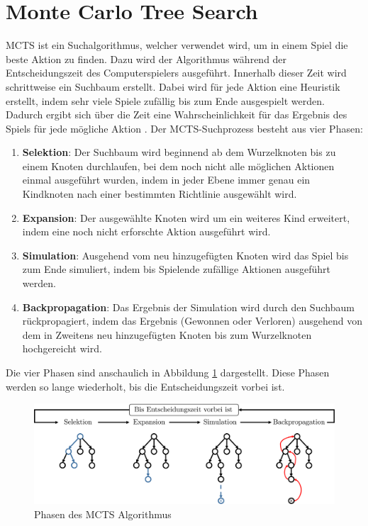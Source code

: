 \vspace*{-5cm}
\pagebreak

\section{Monte Carlo Tree Search}
\label{chapter:monte-carlo-tree-search}

\acf{MCTS} ist ein Suchalgorithmus, welcher verwendet wird, um in einem Spiel die beste Aktion zu finden. Dazu wird der Algorithmus während der Entscheidungszeit des Computerspielers ausgeführt. Innerhalb dieser Zeit wird schrittweise ein Suchbaum erstellt. Dabei wird für jede Aktion eine Heuristik erstellt, indem sehr viele Spiele zufällig bis zum Ende ausgespielt werden. Dadurch ergibt sich über die Zeit eine Wahrscheinlichkeit für das Ergebnis des Spiels für jede mögliche Aktion \cite[S. 61]{2008.ParallelMCTS}. Der \ac{MCTS}-Suchprozess besteht aus vier Phasen:

\begin{enumerate}
    \item \textbf{Selektion}: Der Suchbaum wird beginnend ab dem Wurzelknoten bis zu einem Knoten durchlaufen, bei dem noch nicht alle möglichen Aktionen einmal ausgeführt wurden, indem in jeder Ebene immer genau ein Kindknoten nach einer bestimmten Richtlinie ausgewählt wird. \cite[S. 187]{2018.ReinforcementLearning}
    \item \textbf{Expansion}: Der ausgewählte Knoten wird um ein weiteres Kind erweitert, indem eine noch nicht erforschte Aktion ausgeführt wird. \cite[S. 61]{2008.ParallelMCTS}
    \item \textbf{Simulation}: Ausgehend vom neu hinzugefügten Knoten wird das Spiel bis zum Ende simuliert, indem bis Spielende zufällige Aktionen ausgeführt werden. \cite[S. 61]{2008.ParallelMCTS}
    \item \textbf{Backpropagation}: Das Ergebnis der Simulation wird durch den Suchbaum rückpropagiert, indem das Ergebnis (Gewonnen oder Verloren) ausgehend von dem in Zweitens neu hinzugefügten Knoten bis zum Wurzelknoten hochgereicht wird. \cite[S. 187]{2018.ReinforcementLearning}
\end{enumerate}

Die vier Phasen sind anschaulich in Abbildung \ref{fig:mcts-phases} dargestellt. Diese Phasen werden so lange wiederholt, bis die Entscheidungszeit vorbei ist.

\pagebreak

\begin{figure}[!ht]
    \centering
    \includegraphics[width=\textwidth]{res/pictures/mcts-phases.pdf}
    \caption{Phasen des \acs{MCTS} Algorithmus}
    \label{fig:mcts-phases}
\end{figure}

